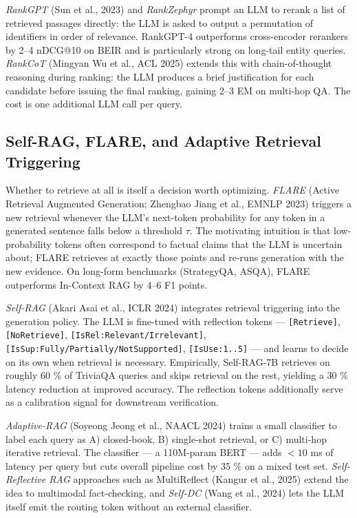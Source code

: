 \emph{RankGPT} (Sun et al., 2023) and \emph{RankZephyr} prompt an LLM to rerank a list of retrieved passages directly: the LLM is asked to output a permutation of identifiers in order of relevance. RankGPT-4 outperforms cross-encoder rerankers by 2--4 nDCG@10 on BEIR and is particularly strong on long-tail entity queries. \emph{RankCoT} (Mingyan Wu et al., ACL 2025) extends this with chain-of-thought reasoning during ranking: the LLM produces a brief justification for each candidate before issuing the final ranking, gaining 2--3 EM on multi-hop QA. The cost is one additional LLM call per query.

\subsection{Self-RAG, FLARE, and Adaptive Retrieval Triggering}\label{self-rag-flare-and-adaptive-retrieval-triggering}

Whether to retrieve at all is itself a decision worth optimizing. \emph{FLARE} (Active Retrieval Augmented Generation; Zhengbao Jiang et al., EMNLP 2023) triggers a new retrieval whenever the LLM's next-token probability for any token in a generated sentence falls below a threshold \(\tau\). The motivating intuition is that low-probability tokens often correspond to factual claims that the LLM is uncertain about; FLARE retrieves at exactly those points and re-runs generation with the new evidence. On long-form benchmarks (StrategyQA, ASQA), FLARE outperforms In-Context RAG by 4--6 F1 points.

\emph{Self-RAG} (Akari Asai et al., ICLR 2024) integrates retrieval triggering into the generation policy. The LLM is fine-tuned with reflection tokens --- \texttt{{[}Retrieve{]}}, \texttt{{[}NoRetrieve{]}}, \texttt{{[}IsRel:Relevant/Irrelevant{]}}, \texttt{{[}IsSup:Fully/Partially/NotSupported{]}}, \texttt{{[}IsUse:1..5{]}} --- and learns to decide on its own when retrieval is necessary. Empirically, Self-RAG-7B retrieves on roughly 60 \% of TriviaQA queries and skips retrieval on the rest, yielding a 30 \% latency reduction at improved accuracy. The reflection tokens additionally serve as a calibration signal for downstream verification.

\emph{Adaptive-RAG} (Soyeong Jeong et al., NAACL 2024) trains a small classifier to label each query as A) closed-book, B) single-shot retrieval, or C) multi-hop iterative retrieval. The classifier --- a 110M-param BERT --- adds \(<10\) ms of latency per query but cuts overall pipeline cost by 35 \% on a mixed test set. \emph{Self-Reflective RAG} approaches such as MultiReflect (Kangur et al., 2025) extend the idea to multimodal fact-checking, and \emph{Self-DC} (Wang et al., 2024) lets the LLM itself emit the routing token without an external classifier.

